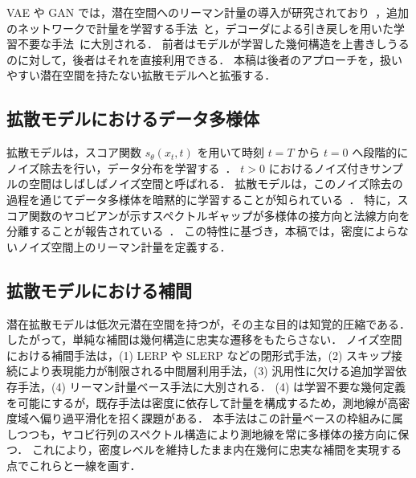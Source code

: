 \documentclass[MIRU,submit]{miru2026j}
\theoremstyle{definition}
\begin{document}
VAE や GAN では，潜在空間へのリーマン計量の導入が研究されており~\cite{Gruffaz2025}，追加のネットワークで計量を学習する手法~\cite{Arvanitidis2022,Lee2022,Sorrenson2025}と，デコーダによる引き戻しを用いた学習不要な手法~\cite{Shao2017,Chen2018,Arvanitidis2018,Arvanitidis2021,Diepeveen2025}に大別される．
前者はモデルが学習した幾何構造を上書きしうるのに対して，後者はそれを直接利用できる．
本稿は後者のアプローチを，扱いやすい潜在空間を持たない拡散モデルへと拡張する．

\subsection{拡散モデルにおけるデータ多様体}
拡散モデルは，スコア関数 $s_\theta(x_t, t)$ を用いて時刻 $t=T$ から $t=0$ へ段階的にノイズ除去を行い，データ分布を学習する~\cite{Sohl-Dickstein2015,Ho2020,Song2021a,Song2021b,Rombach2022}．
$t>0$ におけるノイズ付きサンプルの空間はしばしばノイズ空間と呼ばれる．
拡散モデルは，このノイズ除去の過程を通じてデータ多様体を暗黙的に学習することが知られている~\cite{Pidstrigach2022,Wenliang2022,Tang2024,Yun2024,George2025,Potaptchik2025}．
特に，スコア関数のヤコビアンが示すスペクトルギャップが多様体の接方向と法線方向を分離することが報告されている~\cite{Stanczuk2024,Ventura2025}．
この特性に基づき，本稿では，密度によらないノイズ空間上のリーマン計量を定義する．

\subsection{拡散モデルにおける補間}
潜在拡散モデルは低次元潜在空間を持つが，その主な目的は知覚的圧縮である．
したがって，単純な補間は幾何構造に忠実な遷移をもたらさない．
ノイズ空間における補間手法は，(1) LERP や SLERP などの閉形式手法，(2) スキップ接続により表現能力が制限される中間層利用手法，(3) 汎用性に欠ける追加学習依存手法，(4) リーマン計量ベース手法に大別される．
(4) は学習不要な幾何定義を可能にするが，既存手法は密度に依存して計量を構成するため，測地線が高密度域へ偏り過平滑化を招く課題がある．
本手法はこの計量ベースの枠組みに属しつつも，ヤコビ行列のスペクトル構造により測地線を常に多様体の接方向に保つ．
これにより，密度レベルを維持したまま内在幾何に忠実な補間を実現する点でこれらと一線を画す．
\end{document}
